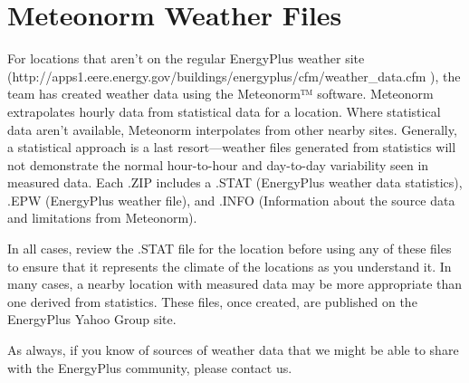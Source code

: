 \section{Meteonorm Weather Files}\label{meteonorm-weather-files}

For locations that aren't on the regular EnergyPlus weather site (http://apps1.eere.energy.gov/buildings/energyplus/cfm/weather\_data.cfm ), the team has created weather data using the Meteonorm™ software. Meteonorm extrapolates hourly data from statistical data for a location. Where statistical data aren't available, Meteonorm interpolates from other nearby sites. Generally, a statistical approach is a last resort---weather files generated from statistics will not demonstrate the normal hour-to-hour and day-to-day variability seen in measured data. Each .ZIP includes a .STAT (EnergyPlus weather data statistics), .EPW (EnergyPlus weather file), and .INFO (Information about the source data and limitations from Meteonorm).

In all cases, review the .STAT file for the location before using any of these files to ensure that it represents the climate of the locations as you understand it. In many cases, a nearby location with measured data may be more appropriate than one derived from statistics. These files, once created, are published on the EnergyPlus Yahoo Group site.

As always, if you know of sources of weather data that we might be able to share with the EnergyPlus community, please contact us.
